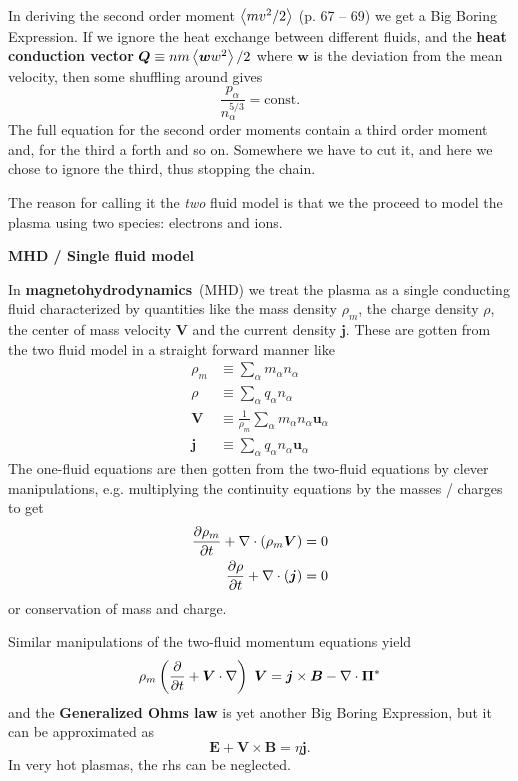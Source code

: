 \documentclass[10pt,landscape]{article}
\renewcommand{\vec}{\bm}
\newcommand{\topiccolor}{green}
\renewcommand{\section}[2]{%
	\renewcommand{\topiccolor}{#2}
	\begin{tcolorbox}[boxsep=0.5mm, left=1mm, right=1mm, top=0mm, bottom=0mm,
		colback=#2!30, colframe=#2, arc is angular]%
		\centering \textbf{#1}%
	\end{tcolorbox}%
	\nopagebreak%
}
\newcommand{\cbf}[1]{\textcolor{\topiccolor!80!black}{\textbf{#1}}}
\begin{document}
\begin{multicols*}{3}
In deriving the second order moment $\left\langle mv^2/2\right\rangle$ (p. 67 -- 69) we get
a Big Boring Expression\texttrademark.
If we ignore the heat exchange between different fluids, and the
\cbf{heat conduction vector}
$\vec Q \equiv n m \expval{\vec w w^2} / 2$
where $\vec w$ is the deviation from the mean velocity,
then some shuffling around gives
\[
	\frac{p_\alpha}{n_\alpha^{5/3}} = \text{const.}
\]
The full equation for the second order moments contain a third order moment and,
for the third a forth and so on.
Somewhere we have to cut it, and here we chose to ignore the third,
thus stopping the chain.

The reason for calling it the \emph{two} fluid model is that we the proceed
to model the plasma using two species: electrons and ions.

\section{MHD / Single fluid model}{lime}

In \cbf{magnetohydrodynamics} (MHD) we treat the plasma as a single conducting
fluid characterized by quantities like the mass density $\rho_m$, the charge
density $\rho$, the center of mass velocity $\vec V$ and the current density
$\vec j$.
These are gotten from the two fluid model in a straight forward manner like
\begin{align*}
	\rho_m &\equiv \sum_\alpha m_\alpha n_\alpha\\
	\rho &\equiv \sum_\alpha q_\alpha n_\alpha\\
	\vec V &\equiv \frac{1}{\rho_m} \sum_\alpha m_\alpha n_\alpha \vec u_\alpha\\
	\vec j &\equiv \sum_\alpha q_\alpha n_\alpha \vec u_\alpha
\end{align*}
The one-fluid equations are then gotten from the two-fluid equations by clever
manipulations, e.g. multiplying the continuity equations by the masses / charges
to get
\begin{align*}
	\diffp{\rho_m}{t} + \nabla \cdot (\rho_m \vec V) = 0\\
	\diffp{\rho}{t} + \nabla \cdot (\vec j) = 0
\end{align*}
or conservation of mass and charge.

Similar manipulations of the two-fluid momentum equations yield
\[
	\rho_m\left(\diffp{}{t} + \vec V \cdot \nabla\right) \vec V
	= \vec j \times \vec B - \nabla \cdot \vec \Pi^*
\]
and the \cbf{Generalized Ohms law} is yet another Big Boring
Expression\texttrademark, but it can be approximated as
\[
	\vec E + \vec V \times \vec B = \eta \vec j.
\]
In very hot plasmas, the rhs can be neglected.



\end{multicols*}
\end{document}
